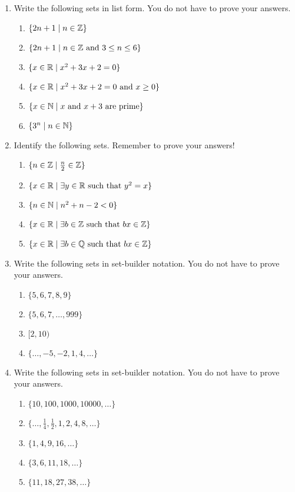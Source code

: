 \probsec{~\ref{sec:what-set}}
\begin{enumerate}
    \item Write the following sets in list form. You do not have to prove your answers.
  \begin{enumerate}
      \item $\{2n + 1 \mid n \in \mathbb{Z}\}$
      \item $\{2n + 1 \mid n \in \mathbb{Z} \text{ and } 3 \leq n \leq 6\}$
      \item $\{x \in \mathbb{R} \mid x^2 + 3x + 2 = 0\}$
      \item $\{x \in \mathbb{R} \mid x^2 + 3x + 2 = 0 \text{ and } x \geq 0\}$
      \item $\{x \in \mathbb{N} \mid x \text{ and } x+3 \text{ are prime}\}$
      \item $\{3^n \mid n \in \mathbb{N}\}$
  \end{enumerate}

    \item Identify the following sets. Remember to prove your answers!
  \begin{enumerate}
      \item $\{n \in \mathbb{Z} \mid \frac{n}{2} \in \mathbb{Z}\}$
      \item $\{x \in \mathbb{R} \mid \exists y \in \mathbb{R} \text{ such that } y^2 = x\}$
      \item $\{n \in \mathbb{N} \mid n^2 + n - 2 < 0\}$
      \item $\{x \in \mathbb{R} \mid \exists b \in \mathbb{Z} \text{ such that } bx \in \mathbb{Z}\}$
      \item $\{x \in \mathbb{R} \mid \exists b \in \mathbb{Q} \text{ such that } bx \in \mathbb{Z}\}$
  \end{enumerate}

    \item Write the following sets in set-builder notation. You do not have to prove your answers.
  \begin{enumerate}
      \item $\{5, 6, 7, 8, 9\}$
      \item $\{5, 6, 7, \dots, 999\}$
      \item $[2, 10)$
      \item $\{\dots, -5, -2, 1, 4, \dots\}$
  \end{enumerate}

    \item Write the following sets in set-builder notation. You do not have to prove your answers.
  \begin{enumerate}
      \item $\{10, 100, 1000, 10000, \dots\}$
      \item $\{\dots, \frac14, \frac12, 1, 2, 4, 8, \dots\}$
      \item $\{1, 4, 9, 16, \dots\}$
      \item $\{3, 6, 11, 18, \dots\}$
      \item $\{11, 18, 27, 38, \dots\}$
  \end{enumerate}


\end{enumerate}
